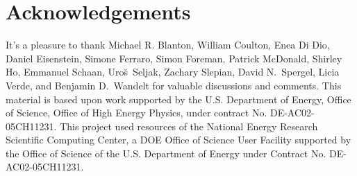 \documentclass[12pt, letterpaper, preprint]{aastex62}
\begin{document}
 

\section*{Acknowledgements}
It's a pleasure to thank 
    Michael R. Blanton, 
    William Coulton, 
    Enea Di Dio, 
    Daniel Eisenstein, 
    Simone Ferraro, 
    Simon Foreman, 
    Patrick McDonald,
    Shirley Ho, 
    Emmanuel Schaan, 
    Uro{\u s}~Seljak,
    Zachary Slepian, 
    David N.~Spergel, 
    Licia Verde, 
    and Benjamin D.~Wandelt
    for valuable discussions and comments. 
This material is based upon work supported by the U.S. Department 
of Energy, Office of Science, Office of High Energy Physics, under 
contract No. DE-AC02-05CH11231.
This project used resources of the National Energy Research 
Scientific Computing Center, a DOE Office of Science User 
Facility supported by the Office of Science of the U.S. 
Department of Energy under Contract No. DE-AC02-05CH11231.

\appendix
 



 
\end{document}
